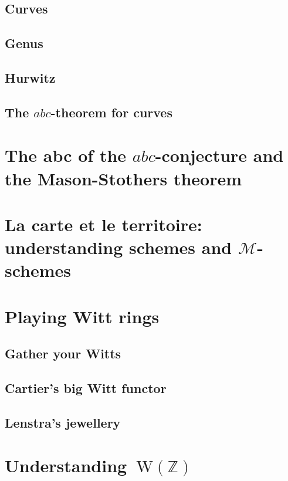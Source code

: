 \documentclass[a4paper]{memoir}
\begin{document}
\section{Curves}
\section{Genus}
\section{Hurwitz}
\section{The $abc$-theorem for curves}



\chapter{The abc of the $abc$-conjecture and the Mason-Stothers theorem}





\chapter{La carte et le territoire: understanding schemes and $\mathcal{M}$-schemes}








\chapter{Playing Witt rings}
\section{Gather your Witts}

\section{Cartier's big Witt functor}
\section{Lenstra's jewellery}


\chapter{Understanding~$\mathrm{W}(\mathbb{Z})$}




\end{document}
